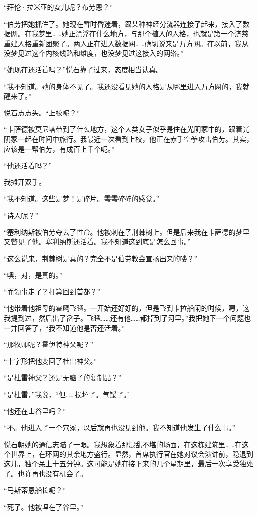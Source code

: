 \documentclass[AutoFakeBold=true]{book}
\begin{document}
``拜伦·拉米亚的女儿呢？布劳恩？''

``伯劳把她抓住了。她现在暂时昏迷着，跟某种神经分流器连接了起来，接入了数据网。在我梦里……她正漂浮在什么地方，与那个植入的人格，也就是第一个济慈重建人格重新团聚了。两人正在进入数据网……确切说来是万方网。在以前，我从没梦见过这个内核线路和维度，也没梦见过这接入的网络。''

``她现在还活着吗？''悦石靠了过来，态度相当认真。

``我不知道。她的身体不见了。我还没看见她的人格是从哪里进入万方网的，我就醒来了。''

悦石点点头。``上校呢？''

``卡萨德被莫尼塔带到了什么地方，这个人类女子似乎是住在光阴冢中的，跟着光阴冢一起在时间中旅行。我最近一次看到上校，他正在赤手空拳攻击伯劳。其实，应该是一帮伯劳，有成百上千个呢。''

``他还活着吗？''

我摊开双手。

``我不知道。这些是梦！是碎片。零零碎碎的感觉。''

``诗人呢？''

``塞利纳斯被伯劳夺去了性命。他被刺在了荆棘树上。但是后来我在卡萨德的梦里又瞥见了他。塞利纳斯还活着。我不知道这到底是怎么回事。''

``这么说来，荆棘树是真的？完全不是伯劳教会宣扬出来的喽？''

``噢，对，是真的。''

``而领事走了？打算回到首都？''

``他带着他祖母的霍鹰飞毯。一开始还好好的，但是飞到卡拉船闸的时候，嗯，这我提到过，然后出了岔子。飞毯……还有他……都掉到了河里。''我把她下一个问题也一并回答了，``我不知道他是否还活着。''

``那牧师呢？霍伊特神父呢？''

``十字形把他变回了杜雷神父。''

``是杜雷神父？还是无脑子的复制品？''

``是杜雷，''我说，``但……损坏了。气馁了。''

``他还在山谷里吗？''

``不。他进入了一个穴冢，以后就再也没见到他。我不知道他发生了什么事。''

悦石朝她的通信志瞄了一眼。我想象着那混乱不堪的场面，在这栋建筑里……在这个世界上，在环网的其余地方盛行。显然，首席执行官在她对议会演讲前，隐退到这儿，独个呆上十五分钟。这可能是她在接下来的几个星期里，最后一次享受独处了。也许再也没有机会了。

``马斯蒂恩船长呢？''

``死了。他被埋在了谷里。''
\end{document}
